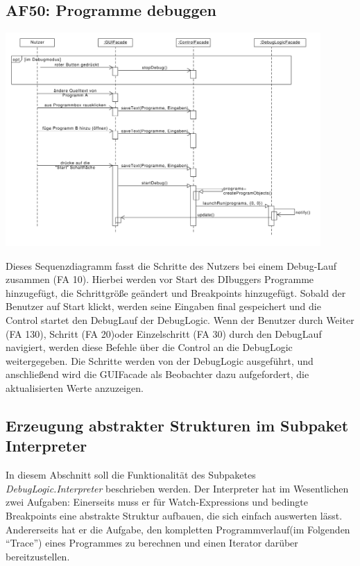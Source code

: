 \documentclass[parskip=full]{scrartcl}
\begin{document}
\subsection{AF50: Programme debuggen}
\begin{center}
\includegraphics[width=0.9\textwidth]{diagrammIdeenUmlet/SequenceDiagrams/seq_AF50PDF.pdf}
\end{center}
Dieses Sequenzdiagramm fasst die Schritte des Nutzers bei einem Debug-Lauf zusammen (FA 10).
Hierbei werden vor Start des DIbuggers Programme hinzugefügt, die Schrittgröße geändert und Breakpoints hinzugefügt.
Sobald der Benutzer auf Start klickt, werden seine Eingaben final gespeichert und die Control startet 
den DebugLauf der DebugLogic.
Wenn der Benutzer durch Weiter (FA 130), Schritt (FA 20)oder Einzelschritt (FA 30) durch den DebugLauf navigiert, werden diese Befehle über
die Control an die DebugLogic weitergegeben. Die Schritte werden von der DebugLogic ausgeführt, und anschließend
wird die GUIFacade als Beobachter dazu aufgefordert, die aktualisierten Werte anzuzeigen.
\subsection{Erzeugung abstrakter Strukturen im Subpaket Interpreter}
In diesem Abschnitt soll die Funktionalität des Subpaketes \textit{DebugLogic.Interpreter} beschrieben werden. Der Interpreter hat im Wesentlichen zwei Aufgaben: Einerseits muss er für Watch-Expressions und bedingte Breakpoints eine abstrakte Struktur aufbauen, die sich einfach auswerten lässt. Andererseits hat er die Aufgabe, den kompletten Programmverlauf(im Folgenden \enquote{Trace})  eines Programmes zu berechnen und einen Iterator darüber bereitzustellen.
\end{document}
